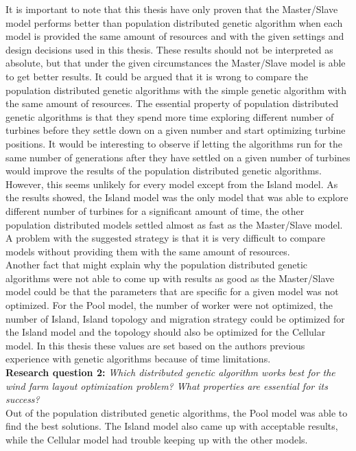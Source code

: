 \noindent It is important to note that this thesis have only proven that the Master/Slave model performs better than population distributed genetic algorithm when each model is provided the same amount of resources and with the given settings and design decisions used in this thesis. These results should not be interpreted as absolute, but that under the given circumstances the Master/Slave model is able to get better results. It could be argued that it is wrong to compare the population distributed genetic algorithms with the simple genetic algorithm with the same amount of resources. The essential property of population distributed genetic algorithms is that they spend more time exploring different number of turbines before they settle down on a given number and start optimizing turbine positions. It would be interesting to observe if letting the algorithms run for the same number of generations after they have settled on a given number of turbines would improve the results of the population distributed genetic algorithms. However, this seems unlikely for every model except from the Island model. As the results showed, the Island model was the only model that was able to explore different number of turbines for a significant amount of time, the other population distributed models settled almost as fast as the Master/Slave model. A problem with the suggested strategy is that it is very difficult to compare models without providing them with the same amount of resources.\\


\noindent Another fact that might explain why the population distributed genetic algorithms were not able to come up with results as good as the Master/Slave model could be that the parameters that are specific for a given model was not optimized. For the Pool model, the number of worker were not optimized, the number of Island, Island topology and migration strategy could be optimized for the Island model and the topology should also be optimized for the Cellular model. In this thesis these values are set based on the authors previous experience with genetic algorithms because of time limitations.\\


\noindent \textbf{Research question 2: } \textit{Which distributed genetic algorithm works best for the wind farm layout optimization problem? What properties are essential for its success?}\\


\noindent Out of the population distributed genetic algorithms, the Pool model was able to find the best solutions. The Island model also came up with acceptable results, while the Cellular model had trouble keeping up with the other models.\\


